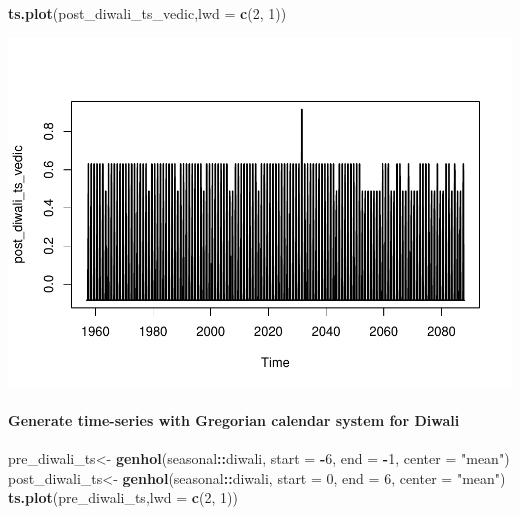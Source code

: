 \documentclass[
]{article}
\newenvironment{Shaded}{\begin{snugshade}}{\end{snugshade}}
\newcommand{\AttributeTok}[1]{\textcolor[rgb]{0.13,0.29,0.53}{#1}}
\newcommand{\DecValTok}[1]{\textcolor[rgb]{0.00,0.00,0.81}{#1}}
\newcommand{\FunctionTok}[1]{\textcolor[rgb]{0.13,0.29,0.53}{\textbf{#1}}}
\newcommand{\NormalTok}[1]{#1}
\newcommand{\OtherTok}[1]{\textcolor[rgb]{0.56,0.35,0.01}{#1}}
\newcommand{\SpecialCharTok}[1]{\textcolor[rgb]{0.81,0.36,0.00}{\textbf{#1}}}
\newcommand{\StringTok}[1]{\textcolor[rgb]{0.31,0.60,0.02}{#1}}
\begin{document}
\begin{Shaded}
\begin{Highlighting}[]
\FunctionTok{ts.plot}\NormalTok{(post\_diwali\_ts\_vedic,}\AttributeTok{lwd =} \FunctionTok{c}\NormalTok{(}\DecValTok{2}\NormalTok{, }\DecValTok{1}\NormalTok{))}
\end{Highlighting}
\end{Shaded}

\includegraphics{regressors_of_diwali_seasonality_for_industrial_production_files/figure-latex/unnamed-chunk-6-2.pdf}

\hypertarget{generate-time-series-with-gregorian-calendar-system-for-diwali}{%
\paragraph{Generate time-series with Gregorian calendar system for
Diwali}\label{generate-time-series-with-gregorian-calendar-system-for-diwali}}

\begin{Shaded}
\begin{Highlighting}[]
\NormalTok{pre\_diwali\_ts}\OtherTok{\textless{}{-}} \FunctionTok{genhol}\NormalTok{(seasonal}\SpecialCharTok{::}\NormalTok{diwali, }\AttributeTok{start =} \SpecialCharTok{{-}}\DecValTok{6}\NormalTok{, }\AttributeTok{end =} \SpecialCharTok{{-}}\DecValTok{1}\NormalTok{, }\AttributeTok{center =} \StringTok{"mean"}\NormalTok{)}
\NormalTok{post\_diwali\_ts}\OtherTok{\textless{}{-}} \FunctionTok{genhol}\NormalTok{(seasonal}\SpecialCharTok{::}\NormalTok{diwali, }\AttributeTok{start =} \DecValTok{0}\NormalTok{, }\AttributeTok{end =} \DecValTok{6}\NormalTok{, }\AttributeTok{center =} \StringTok{"mean"}\NormalTok{)}
\FunctionTok{ts.plot}\NormalTok{(pre\_diwali\_ts,}\AttributeTok{lwd =} \FunctionTok{c}\NormalTok{(}\DecValTok{2}\NormalTok{, }\DecValTok{1}\NormalTok{))}
\end{Highlighting}
\end{Shaded}
\end{document}
